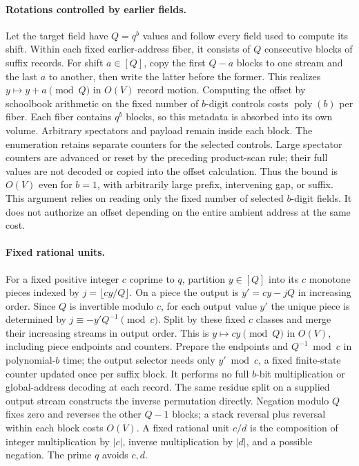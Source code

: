\paragraph{Rotations controlled by earlier fields.}
Let the target field have $Q=q^b$ values and follow every field used to
compute its shift.  Within each fixed earlier-address fiber, it consists
of $Q$ consecutive blocks of suffix records.  For shift $a\in[Q]$,
copy the first $Q-a$ blocks to one stream and the last $a$ to another,
then write the latter before the former.  This realizes
$y\mapsto y+a\pmod Q$ in $O(V)$ record motion.  Computing the offset by
schoolbook arithmetic on the fixed number of $b$-digit controls costs
$\operatorname{poly}(b)$ per fiber.  Each fiber contains $q^b$ blocks,
so this metadata is absorbed into its own volume.  Arbitrary spectators
and payload remain inside each block.
The enumeration retains separate counters for the selected controls.
Large spectator counters are advanced or reset by the preceding
product-scan rule; their full values are not decoded or copied into
the offset calculation. Thus the bound is $O(V)$ even for $b=1$,
with arbitrarily large prefix, intervening gap, or suffix.
This argument relies on reading only the fixed number of selected
$b$-digit fields. It does not authorize an offset depending on the
entire ambient address at the same cost.

\paragraph{Fixed rational units.}
For a fixed positive integer $c$ coprime to $q$, partition $y\in[Q]$
into its $c$ monotone pieces indexed by $j=\lfloor cy/Q\rfloor$.
On a piece the output is $y'=cy-jQ$ in increasing order.  Since
$Q$ is invertible modulo $c$, for each output value $y'$ the unique piece
is determined by $j\equiv-y'Q^{-1}\pmod c$.  Split by these fixed $c$
classes and merge their increasing streams in output order.  This is
$y\mapsto cy\pmod Q$ in $O(V)$, including piece endpoints and counters.
Prepare the endpoints and $Q^{-1}\bmod c$ in polynomial-$b$ time;
the output selector needs only $y'\bmod c$, a fixed finite-state
counter updated once per suffix block. It performs no full $b$-bit
multiplication or global-address decoding at each record.
The same residue split on a supplied output stream constructs the inverse
permutation directly.  Negation modulo $Q$ fixes zero and reverses the
other $Q-1$ blocks; a stack reversal plus reversal within each block costs
$O(V)$.  A fixed rational unit $c/d$ is the composition of integer
multiplication by $|c|$, inverse multiplication by $|d|$, and a possible
negation.  The prime $q$ avoids $c,d$.

